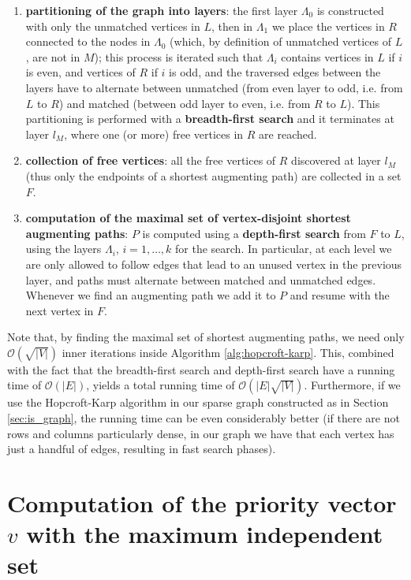 \begin{enumerate}
	\item \textbf{partitioning of the graph into layers}: the first layer $\Lambda_0$ is constructed with only the unmatched vertices in $L$, then in $\Lambda_1$ we place the vertices in $R$ connected to the nodes in $\Lambda_0$ (which, by definition of unmatched vertices of $L$, are not in $M$); this process is iterated such that $\Lambda_i$ contains vertices in $L$ if $i$ is even, and vertices of $R$ if $i$ is odd, and the traversed edges between the layers have to alternate between unmatched (from even layer to odd, i.e. from $L$ to $R$) and matched (between odd layer to even, i.e. from $R$ to $L$). This partitioning is performed with a \textbf{breadth-first search} and it terminates at layer $l_M$, where one (or more) free vertices in $R$ are reached.
	\item \textbf{collection of free vertices}: all the free vertices of $R$ discovered at layer $l_M$ (thus only the endpoints of a shortest augmenting path) are collected in a set $F$.
	\item \textbf{computation of the maximal set of vertex-disjoint shortest augmenting paths}: $P$ is computed using a \textbf{depth-first search} from $F$ to $L$, using the layers $\Lambda_i$, $i=1,\dots,k$ for the search. In particular, at each level we are only allowed to follow edges that lead to an unused vertex in the previous layer, and paths must alternate between matched and unmatched edges. Whenever we find an augmenting path we add it to $P$ and resume with the next vertex in $F$.
\end{enumerate}

Note that, by finding the maximal set of shortest augmenting paths, we need only $\mathcal{O}\left( \sqrt{|V|} \right)$ inner iterations inside Algorithm \ref{alg:hopcroft-karp}. This, combined with the fact that the breadth-first search and depth-first search have a running time of $\mathcal{O}(|E|)$, yields a total running time of $\mathcal{O} \left( |E|\sqrt{|V|} \right)$.
Furthermore, if we use the Hopcroft-Karp algorithm in our sparse graph constructed as in Section \ref{sec:is_graph}, the running time can be even considerably better (if there are not rows and columns particularly dense, in our graph we have that each vertex has just a handful of edges, resulting in fast search phases).

\section{Computation of the priority vector $v$ with the maximum independent set}

